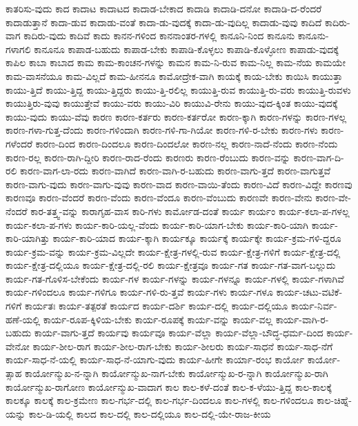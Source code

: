 {ಕಾತರಿಸು-ವುದು
ಕಾದ
ಕಾದಾಟ
ಕಾದಾಟದ
ಕಾದಾಡ-ಬೇಕಾದ
ಕಾದಾಡಿ
ಕಾದಾಡಿ-ದನೋ
ಕಾದಾಡಿ-ದ-ರೆಂದರೆ
ಕಾದಾಡುತ್ತಾನೆ
ಕಾದಾ-ಡುವ
ಕಾದಾಡು-ವಂತೆ
ಕಾದಾ-ಡು-ವುದಕ್ಕೆ
ಕಾದಾ-ಡು-ವುದಿಲ್ಲ
ಕಾದಾಡು-ವುವು
ಕಾದಿದೆ
ಕಾದಿರು-ವಾಗ
ಕಾದಿರು-ವುದು
ಕಾದಿವೆ
ಕಾದು
ಕಾನನ-ಗಳಿಂದ
ಕಾನನಾಂತರ-ಗಳಲ್ಲಿ
ಕಾನೂನಿ-ನಿಂದ
ಕಾನೂನು
ಕಾನೂನು-ಗಳಾಗಲಿ
ಕಾನೂನೂ
ಕಾಪಾಡ-ಬಹುದು
ಕಾಪಾಡ-ಬೇಕು
ಕಾಪಾಡಿ-ಕೊಳ್ಳಲು
ಕಾಪಾಡಿ-ಕೊಳ್ಳೋಣ
ಕಾಪಾಡು-ವುದಕ್ಕೆ
ಕಾಪಿಲ
ಕಾಬಾ
ಕಾಬಾದ
ಕಾಮ
ಕಾಮ-ಕಾಂಚನ-ಗಳನ್ನು
ಕಾಮನ
ಕಾಮ-ನಿ-ರುವ
ಕಾಮ-ನಿಲ್ಲ
ಕಾಮ-ನೆಯ
ಕಾಮಯೇ
ಕಾಮ-ವಾಸನೆಯೂ
ಕಾಮ-ವಿಲ್ಲದೆ
ಕಾಮ-ಹೀನನೂ
ಕಾಮೋದ್ರೇಕ-ವಾಗಿ
ಕಾಯಕ್ಕೆ
ಕಾಯ-ಬೇಕು
ಕಾಯಿಸಿ
ಕಾಯುತ್ತಾ
ಕಾಯು-ತ್ತಿದೆ
ಕಾಯು-ತ್ತಿದ್ದ
ಕಾಯು-ತ್ತಿದ್ದರು
ಕಾಯು-ತ್ತಿ-ರಲಿಲ್ಲ
ಕಾಯುತ್ತಿ-ರುವ
ಕಾಯುತ್ತಿ-ರು-ವರು
ಕಾಯುತ್ತಿ-ರುವಳು
ಕಾಯುತ್ತಿರು-ವುವು
ಕಾಯುತ್ತೇವೆ
ಕಾಯು-ವರು
ಕಾಯು-ವಿರಿ
ಕಾಯುವಿ-ರೇನು
ಕಾಯು-ವುದ-ಕ್ಕಿಂತ
ಕಾಯು-ವುದಕ್ಕೆ
ಕಾಯು-ವುದು
ಕಾಯು-ವೆವು
ಕಾರಣ
ಕಾರಣ-ಕರ್ತರು
ಕಾರಣ-ಕರ್ತರೋ
ಕಾರಣ-ಕ್ಕಾಗಿ
ಕಾರಣ-ಗಳನ್ನು
ಕಾರಣ-ಗಳಲ್ಲ
ಕಾರಣ-ಗಳಾ-ಗುತ್ತ-ದೆಂದು
ಕಾರಣ-ಗಳಿಂದಾಗಿ
ಕಾರಣ-ಗಳಿ-ಗಾ-ಗಿಯೋ
ಕಾರಣ-ಗಳಿ-ರ-ಬೇಕು
ಕಾರಣ-ಗಳು
ಕಾರಣ-ಗಳೆಂದರೆ
ಕಾರಣ-ದಿಂದ
ಕಾರಣ-ದಿಂದಲೂ
ಕಾರಣ-ದಿಂದಲೋ
ಕಾರಣ-ನಲ್ಲ
ಕಾರಣ-ನಾದೆ-ನೆಂದು
ಕಾರಣ-ನೆಂದು
ಕಾರಣ-ರಲ್ಲ
ಕಾರಣ-ರಾಗಿ-ದ್ದೀರಿ
ಕಾರಣ-ರಾದ-ರೆಂದು
ಕಾರಣರು
ಕಾರಣ-ರೆಂಬುದು
ಕಾರಣ-ವನ್ನು
ಕಾರಣ-ವಾಗ-ದಿ-ರಲಿ
ಕಾರಣ-ವಾಗ-ಲಾ-ರದು
ಕಾರಣ-ವಾಗಿದೆ
ಕಾರಣ-ವಾಗಿ-ರ-ಬಹುದು
ಕಾರಣ-ವಾಗು-ತ್ತದೆ
ಕಾರಣ-ವಾಗುತ್ತವೆ
ಕಾರಣ-ವಾಗು-ವುದು
ಕಾರಣ-ವಾಗು-ವುವು
ಕಾರಣ-ವಾದ
ಕಾರಣ-ವಾಯಿ-ತೆಂದು
ಕಾರಣ-ವಿದೆ
ಕಾರಣ-ವಿದ್ದೇ
ಕಾರಣವು
ಕಾರಣವೂ
ಕಾರಣ-ವೆಂದರೆ
ಕಾರಣ-ವೆಂದು
ಕಾರಣ-ವೆಂದೂ
ಕಾರಣ-ವೆಂಬುದು
ಕಾರಣವೇ
ಕಾರಣ-ವೇನು
ಕಾರಣ-ವೇ-ನೆಂದರೆ
ಕಾರ-ತತ್ತ್ವ-ವನ್ನು
ಕಾರಾಗೃಹ-ವಾಸ
ಕಾರಿ-ಗಳು
ಕಾರ್ಮೋಡ-ದಂತೆ
ಕಾರ್ಯ
ಕಾರ್ಯಂ
ಕಾರ್ಯ-ಕಲಾ-ಪ-ಗಳಲ್ಲ
ಕಾರ್ಯ-ಕಲಾ-ಪ-ಗಳು
ಕಾರ್ಯ-ಕಾರಿ-ಯಲ್ಲ-ವೆಂದು
ಕಾರ್ಯ-ಕಾರಿ-ಯಾಗ-ಬೇಕು
ಕಾರ್ಯ-ಕಾರಿ-ಯಾಗಿ
ಕಾರ್ಯ-ಕಾರಿ-ಯಾಗಿತ್ತು
ಕಾರ್ಯ-ಕಾರಿ-ಯಾದ
ಕಾರ್ಯ-ಕ್ಕಾಗಿ
ಕಾರ್ಯಕ್ಕೂ
ಕಾರ್ಯಕ್ಕೆ
ಕಾರ್ಯಕ್ಕೇ
ಕಾರ್ಯ-ಕ್ರಮ-ಗಳಿ-ದ್ದರೂ
ಕಾರ್ಯ-ಕ್ರಮ-ವನ್ನು
ಕಾರ್ಯ-ಕ್ರಮ-ವಿಲ್ಲದೇ
ಕಾರ್ಯ-ಕ್ಷೇತ್ರ-ಗಳಲ್ಲಿ-ರುವ
ಕಾರ್ಯ-ಕ್ಷೇತ್ರ-ಗಳಿಗೆ
ಕಾರ್ಯ-ಕ್ಷೇತ್ರ-ದಲ್ಲಿ
ಕಾರ್ಯ-ಕ್ಷೇತ್ರ-ದಲ್ಲಿಯೂ
ಕಾರ್ಯ-ಕ್ಷೇತ್ರ-ದಲ್ಲಿ-ರಲಿ
ಕಾರ್ಯ-ಕ್ಷೇತ್ರವೂ
ಕಾರ್ಯ-ಗತ
ಕಾರ್ಯ-ಗತ-ವಾಗ-ಬಲ್ಲುದು
ಕಾರ್ಯ-ಗತ-ಗೊಳಿಸ-ಬೇಕೆಂದು
ಕಾರ್ಯ-ಗಳ
ಕಾರ್ಯ-ಗಳನ್ನು
ಕಾರ್ಯ-ಗಳನ್ನೂ
ಕಾರ್ಯ-ಗಳಲ್ಲಿ
ಕಾರ್ಯ-ಗಳಾಗಿವೆ
ಕಾರ್ಯ-ಗಳಿಂದಲೂ
ಕಾರ್ಯ-ಗಳಿಗೂ
ಕಾರ್ಯ-ಗಳಿ-ರು-ತ್ತವೆ
ಕಾರ್ಯ-ಗಳು
ಕಾರ್ಯ-ಗಳೂ
ಕಾರ್ಯ-ಚಟು-ವಟಿಕೆ-ಗಳಿಗೆ
ಕಾರ್ಯತಃ
ಕಾರ್ಯ-ತತ್ಪರತೆ
ಕಾರ್ಯದ
ಕಾರ್ಯ-ದರ್ಶಿ
ಕಾರ್ಯ-ದಲ್ಲಿ
ಕಾರ್ಯ-ದಲ್ಲಿಯೂ
ಕಾರ್ಯ-ನಿರ್ವ-ಹಣೆ-ಯಲ್ಲಿ
ಕಾರ್ಯ-ರೂಪ-ಕ್ಕಿಳಿಯ-ಬೇಕು
ಕಾರ್ಯ-ರೂಪಕ್ಕೆ
ಕಾರ್ಯ-ವನ್ನು
ಕಾರ್ಯ-ವಲ್ಲ
ಕಾರ್ಯ-ವಾಗಿ-ರ-ಬಹುದು
ಕಾರ್ಯ-ವಾಗು-ತ್ತದೆ
ಕಾರ್ಯವು
ಕಾರ್ಯವೂ
ಕಾರ್ಯ-ವೆಲ್ಲಾ
ಕಾರ್ಯ-ವೆಲ್ಲಾ-ಬೌದ್ಧ-ಧರ್ಮ-ದಿಂದ
ಕಾರ್ಯ-ವೇನೋ
ಕಾರ್ಯ-ಶೀಲ-ರಾಗ
ಕಾರ್ಯ-ಶೀಲ-ರಾಗ-ಬೇಕು
ಕಾರ್ಯ-ಶೀಲರು
ಕಾರ್ಯ-ಸಾಧನೆ
ಕಾರ್ಯ-ಸಾಧ-ನೆಗೆ
ಕಾರ್ಯ-ಸಾಧ-ನೆ-ಯಲ್ಲಿ
ಕಾರ್ಯ-ಸಾಧ-ನೆ-ಯಾಗು-ವುದು
ಕಾರ್ಯ-ಹೀಗೇ
ಕಾರ್ಯಾ-ರಂಭ
ಕಾರ್ಯೋ
ಕಾರ್ಯೋ-ತ್ಸಾಹ
ಕಾರ್ಯೋನ್ಮುಖ-ನ-ನ್ನಾಗಿ
ಕಾರ್ಯೋನ್ಮುಖ-ನಾಗ-ಬೇಕು
ಕಾರ್ಯೋನ್ಮುಖ-ರ-ನ್ನಾಗಿ
ಕಾರ್ಯೋನ್ಮುಖ-ರಾಗಿ
ಕಾರ್ಯೋನ್ಮುಖ-ರಾಗೋಣ
ಕಾರ್ಯೋನ್ಮುಖ-ವಾದಾಗ
ಕಾಲ
ಕಾಲ-ಕಳೆ-ದಂತೆ
ಕಾಲ-ಕ-ಳೆಯು-ತ್ತಿದ್ದ
ಕಾಲ-ಕಾಲಕ್ಕೆ
ಕಾಲಕ್ಕೂ
ಕಾಲಕ್ಕೆ
ಕಾಲ-ಕ್ರಮೇಣ
ಕಾಲ-ಗರ್ಭ-ದಲ್ಲಿ
ಕಾಲ-ಗರ್ಭ-ದಿಂದಲೂ
ಕಾಲ-ಗಳಲ್ಲಿ
ಕಾಲ-ಗಳಿಂದಲೂ
ಕಾಲ-ಚಿಹ್ನೆ-ಯನ್ನು
ಕಾಲ-ಡಿ-ಯಲ್ಲಿ
ಕಾಲದ
ಕಾಲ-ದಲ್ಲಿ
ಕಾಲ-ದಲ್ಲಿಯೂ
ಕಾಲ-ದಲ್ಲಿ-ಯೇ-ರಾಜ-ಕೀಯ
}
